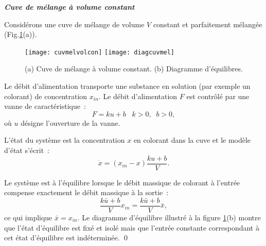 \begin{exemple}{\bf{\em Cuve de m\'elange \`a volume constant}}

Consid\'erons une cuve de m\'elange de volume $V$ constant et
parfaitement m\'elang\'ee (Fig.\ref{fig:diagcuvmel}(a)). 
\begin{figure}[ht] 
\begin{center}
\texttt{[image: cuvmelvolcon]}
\hspace{1cm}
\texttt{[image: diagcuvmel]}
\caption{(a) Cuve de m\'elange \`a volume constant. (b) Diagramme d'équilibres.}
\label{fig:diagcuvmel}
\end{center} 
\end{figure}
Le d\'ebit d'alimentation
transporte une substance en solution (par exemple un colorant) de
concentration $x_{in}$. Le d\'ebit d'alimentation $F$ est contrôl\'e
par une vanne de caract\'eristique~:
$$F=k u+b\;\;\;k>0,\;\;b>0,$$
o\`u $u$ d\'esigne l'ouverture de la vanne.

L'\'etat du syst\`eme est la concentration $x$  en colorant dans la
cuve et le mod\`ele d'\'etat s'\'ecrit~:
$$\dot x= (x_{in}-x)\frac{k u+b}{V}.$$

Le syst\`eme est \`a l'\'equilibre lorsque le d\'ebit massique de
colorant \`a l'entr\'ee compense exactement le d\'ebit massique \`a
la sortie~:
$$\frac{k \bar u +b}{V}x_{in}=\frac{k \bar u +b}{V}\bar x,$$
ce qui implique $\bar x =x_{in}$.
Le diagramme d'\'equilibre illustr\'e \`a la figure \ref{fig:diagcuvmel}(b) montre que
l'\'etat d'\'equilibre est fix\'e et isol\'e mais que l'entr\'ee
constante correspondant \`a cet \'etat d'\'equilibre est
ind\'etermin\'ee. \qed
\end{exemple}
\vv

